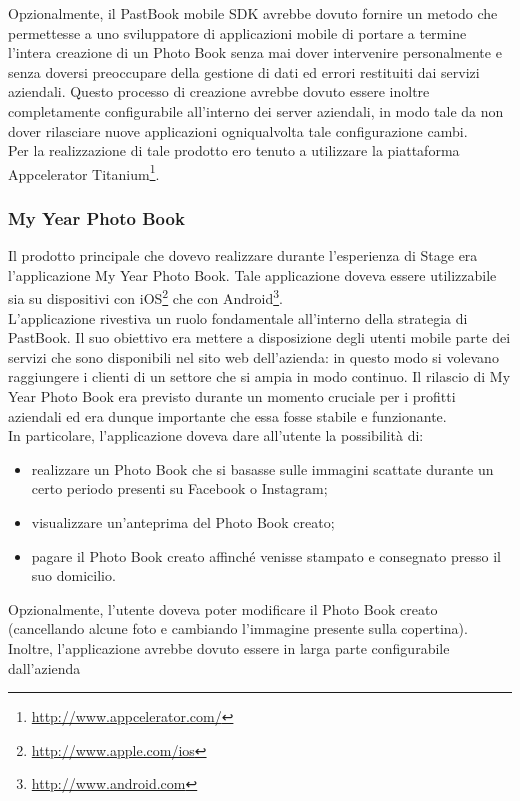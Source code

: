 				Opzionalmente, il PastBook mobile SDK avrebbe dovuto fornire un metodo che permettesse a uno sviluppatore
				di applicazioni mobile di portare a termine l'intera creazione di un Photo Book senza mai dover intervenire
				personalmente e senza doversi preoccupare della gestione di dati ed errori restituiti dai servizi aziendali. Questo
				processo di creazione avrebbe dovuto essere inoltre completamente configurabile all'interno dei server aziendali, in
				modo tale da non dover rilasciare nuove applicazioni ogniqualvolta tale configurazione cambi.\\
				Per la realizzazione di tale prodotto ero tenuto a utilizzare la piattaforma
				Appcelerator Titanium\footnote{\url{http://www.appcelerator.com/}}.
			\subsubsection{My Year Photo Book}
				Il prodotto principale che dovevo realizzare durante l'esperienza di Stage era l'applicazione My Year Photo Book.
				Tale applicazione doveva essere utilizzabile sia su dispositivi con iOS\footnote{\url{http://www.apple.com/ios}} che
				con Android\footnote{\url{http://www.android.com}}.\\
				L'applicazione rivestiva un ruolo fondamentale all'interno della strategia di PastBook. Il suo obiettivo era
				mettere a disposizione degli utenti mobile parte dei servizi che sono disponibili nel sito web dell'azienda: in
				questo modo si volevano raggiungere i clienti di un settore che si ampia in modo continuo. Il rilascio di My Year
				Photo Book era previsto durante un momento cruciale per i profitti aziendali ed era dunque importante che essa fosse
				stabile e funzionante.\\
				In particolare, l'applicazione doveva dare all'utente la possibilità di:
				\begin{itemize}
					\item realizzare un Photo Book che si basasse sulle immagini scattate durante un certo periodo presenti
					su Facebook o Instagram;
					\item visualizzare un'anteprima del Photo Book creato;
					\item pagare il Photo Book creato affinché venisse stampato e consegnato presso il suo domicilio.
				\end{itemize}
				Opzionalmente, l'utente doveva poter modificare il Photo Book creato (cancellando alcune foto e cambiando l'immagine
				presente sulla copertina). Inoltre, l'applicazione avrebbe dovuto essere in larga parte configurabile dall'azienda
